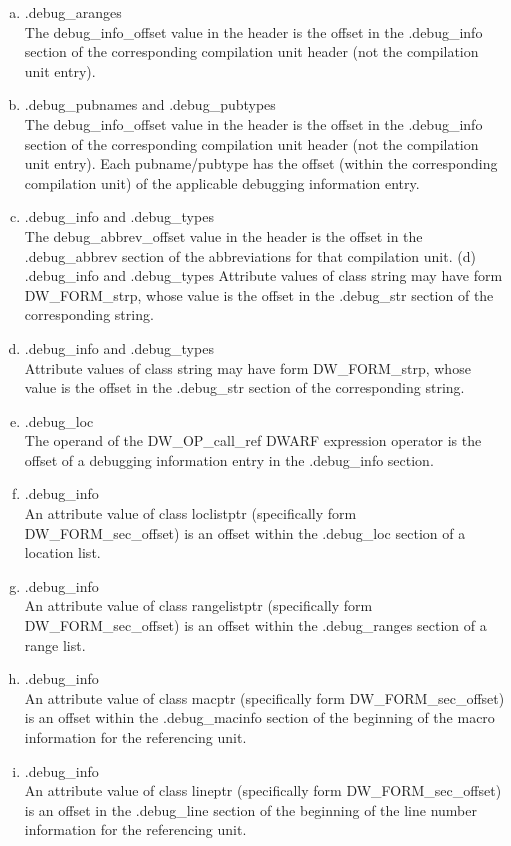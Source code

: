 \clearpage
\begin{enumerate}[(a)]  
\item  .debug\_aranges  \\
The debug\_info\_offset value in
the header is the offset in the .debug\_info section of the
corresponding compilation unit header (not the compilation
unit entry).

\item .debug\_pubnames and .debug\_pubtypes \\
The debug\_info\_offset value in the header is the offset in the
.debug\_info section of the corresponding compilation unit header (not
the compilation unit entry). Each pubname/pubtype has the offset (within
the corresponding compilation unit) of the applicable debugging
information entry.

\item .debug\_info and .debug\_types \\
The debug\_abbrev\_offset value in the header is the offset in the
.debug\_abbrev section of the abbreviations for that compilation unit.
(d) .debug\_info and .debug\_types
Attribute values of class string may have form DW\_FORM\_strp, whose
value is the offset in the .debug\_str section of the corresponding string.

\item  .debug\_info and .debug\_types \\
Attribute values of class string may have form DW\_FORM\_strp, whose
value is the offset in the .debug\_str section of the corresponding string.

\item .debug\_loc \\
The operand of the DW\_OP\_call\_ref DWARF expression operator is the
offset of a debugging information entry in the .debug\_info section.

\item .debug\_info \\
An attribute value of class loclistptr (specifically form
DW\_FORM\_sec\_offset) is an offset within the .debug\_loc section of a
location list.

\item .debug\_info \\
An attribute value of class rangelistptr (specifically form
DW\_FORM\_sec\_offset) is an offset within the .debug\_ranges section of
a range list.


\item .debug\_info \\
An attribute value of class macptr (specifically form
DW\_FORM\_sec\_offset) is an offset within the .debug\_macinfo section
of the beginning of the macro information for the referencing unit.


\item .debug\_info \\
An attribute value of class lineptr (specifically form
DW\_FORM\_sec\_offset) is an offset in the .debug\_line section of the
beginning of the line number information for the referencing unit.
\end{enumerate}



